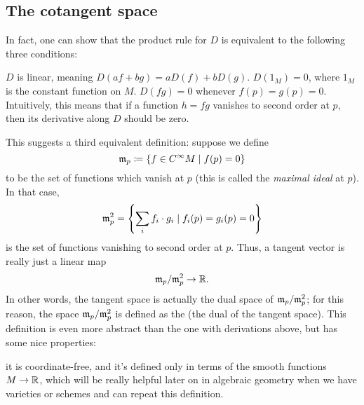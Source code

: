 \subsection{The cotangent space}
In fact, one can show that the product rule
for $D$ is equivalent to the following three conditions:
\begin{enumerate}
	\ii $D$ is linear, meaning $D(af+bg) = a D(f) + b D(g)$.
	\ii $D(1_M) = 0$, where $1_M$ is the constant function on $M$.
	\ii $D(fg) = 0$ whenever $f(p) = g(p) = 0$.
	Intuitively, this means that if a function $h = fg$
	vanishes to second order at $p$,
	then its derivative along $D$ should be zero.
\end{enumerate}

This suggests a third equivalent definition:
suppose we define
\[ \mathfrak m_p \coloneqq \left\{ f \in C^\infty M \mid f(p) = 0 \right\} \]
to be the set of functions which vanish at $p$
(this is called the \emph{maximal ideal} at $p$).
In that case,
\[ \mathfrak m_p^2 = \left\{ \sum_i f_i \cdot g_i
	\mid f_i(p) = g_i(p) = 0 \right\} \]
is the set of functions vanishing to second order at $p$.
Thus, a tangent vector is really just a linear map
\[ \mathfrak m_p / \mathfrak m_p^2 \to \mathbb R. \]
In other words, the tangent space is actually the
dual space of $\mathfrak m_p / \mathfrak m_p^2$;
for this reason, the space $\mathfrak m_p / \mathfrak m_p^2$ is defined as the
 (the dual of the tangent space).
This definition is even more abstract than the one with derivations above,
but has some nice properties:
\begin{itemize}
	\ii it is coordinate-free, and
	\ii it's defined only in terms of the smooth functions $M \to \mathbb R$,
	which will be really helpful later on in algebraic geometry
	when we have varieties or schemes and can repeat this definition.
\end{itemize}

